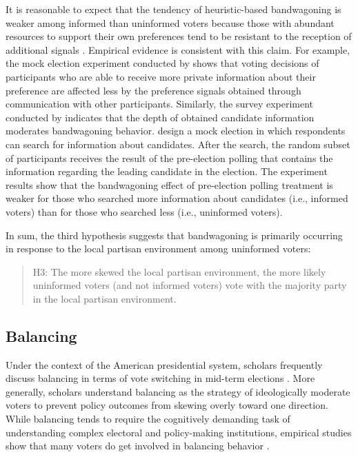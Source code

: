 \documentclass[letterpaper, 12pt]{article}
\begin{document}
    \par It is reasonable to expect that the tendency of heuristic-based bandwagoning is weaker among informed than uninformed voters because those with abundant resources to support their own preferences tend to be resistant to the reception of additional signals \citep{Zaller1992thna}. Empirical evidence is consistent with this claim. For example, the mock election experiment conducted by \cite{Huckfeldt2014nobi} shows that voting decisions of participants who are able to receive more private information about their preference are affected less by the preference signals obtained through communication with other participants. Similarly, the survey experiment conducted by \cite{Roy2015anex} indicates that the depth of obtained candidate information moderates bandwagoning behavior. \cite{Roy2015anex} design a mock election in which respondents can search for information about candidates. After the search, the random subset of participants receives the result of the pre-election polling that contains the information regarding the leading candidate in the election. The experiment results show that the bandwagoning effect of pre-election polling treatment is weaker for those who searched more information about candidates (i.e., informed voters) than for those who searched less (i.e., uninformed voters). 

    \par In sum, the third hypothesis suggests that bandwagoning is primarily occurring in response to the local partisan environment among uninformed voters:

    \begin{verse}
        H3: The more skewed the local partisan environment, the more likely uninformed voters (and not informed voters) vote with the majority party in the local partisan environment. 
    \end{verse}

    \subsection*{Balancing}

    \par Under the context of the American presidential system, scholars frequently discuss balancing in terms of vote switching in mid-term elections \citep[e.g.,][]{Alesina1995papo}. More generally, scholars understand balancing as the strategy of ideologically moderate voters to prevent policy outcomes from skewing overly toward one direction. While balancing tends to require the cognitively demanding task of understanding complex electoral and policy-making institutions, 
    empirical studies show that many voters do get involved in balancing behavior \citep{Kedar2005whmo, Kedar2006hovo}.  
    
\end{document}
